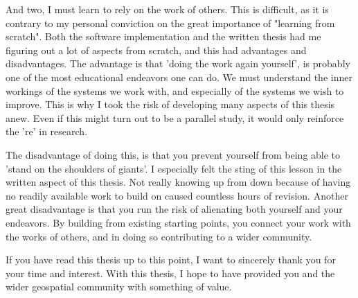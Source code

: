 And two, I must learn to rely on the work of others.
This is difficult, as it is contrary to my personal conviction on the great importance of "learning from scratch".
Both the software implementation and the written thesis had me figuring out a lot of aspects from scratch, and this had advantages and disadvantages.
The advantage is that 'doing the work again yourself', is probably one of the most educational endeavors one can do. 
We must understand the inner workings of the systems we work with, and especially of the systems we wish to improve. 
This is why I took the risk of developing many aspects of this thesis anew. 
Even if this might turn out to be a parallel study, it would only reinforce the 're' in research. 

The disadvantage of doing this, is that you prevent yourself from being able to 'stand on the shoulders of giants'.
I especially felt the sting of this lesson in the written aspect of this thesis. 
Not really knowing up from down because of having no readily available work to build on caused countless hours of revision.
Another great disadvantage is that you run the risk of alienating both yourself and your endeavors. 
By building from existing starting points, you connect your work with the works of others, and in doing so contributing to a wider community.

If you have read this thesis up to this point, I want to sincerely thank you for your time and interest.
With this thesis, I hope to have provided you and the wider geospatial community with something of value.





